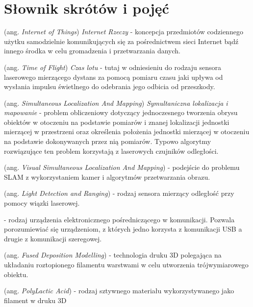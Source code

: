 \chapter*{Słownik skrótów i pojęć}\mbox{}
\label{sec:skroty}
\noindent
\begin{description}[labelwidth=*]
  \item  [IoT] (ang. \emph{Internet of Things}) \emph{Internet Rzeczy} - koncepcja przedmiotów codziennego użytku samodzielnie komunikujących się za pośrednictwem sieci Internet bądź innego środka w celu gromadzenia i przetwarzania danych.
  
  \item [ToF] (ang. \emph{Time of Flight}) \emph{Czas lotu} - tutaj w odniesieniu do rodzaju sensora laserowego mierzącego dystans za pomocą pomiaru czasu jaki upływa od wysłania impulsu świetlnego do odebrania jego odbicia od przeszkody.
  
  \item [SLAM] (ang. \emph{Simultaneous Localization And Mapping}) \emph{Symultaniczna lokalizacja i mapowanie} - problem obliczeniowy dotyczący jednoczesnego tworzenia obrysu obiektów w otoczeniu na podstawie pomiarów i znanej lokalizacji jednostki mierzącej w przestrzeni oraz określenia położenia jednostki mierzącej w otoczeniu na podstawie dokonywanych przez nią pomiarów. Typowo algorytmy rozwiązujące ten problem korzystają z laserowych czujników odległości.
  
  \item [VSLAM] (ang. \emph{Visual Simultaneous Localization And Mapping}) - podejście do problemu SLAM z wykorzystaniem kamer i algorytmów przetwarzania obrazu.
  
  \item [LIDAR] (ang. \emph{Light Detection and Ranging}) - rodzaj sensora mierzący odległość przy pomocy wiązki laserowej.
  
  \item [USB-UART] - rodzaj urządzenia elektronicznego pośredniczącego w komunikacji. Pozwala porozumiewiać się urządzeniom, z których jedno korzysta z komunikacji USB a drugie z komunikacji szeregowej.
  
  \item [FDM] (ang. \emph{Fused Deposition Modelling}) - technologia druku 3D polegająca na układaniu roztopionego filamentu warstwami w celu utworzenia trójwymiarowego obiektu.
  
  \item [PLA] (ang. \emph{PolyLactic Acid}) - rodzaj sztywnego materiału wykorzystywanego jako filament w druku 3D
  

\end{description}
